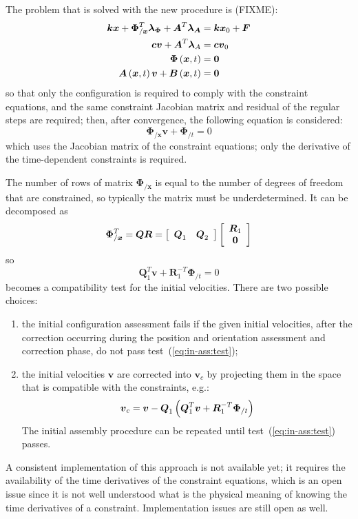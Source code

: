 \documentclass[10pt,dvips,fleqn]{report}
\newcommand{\T}[1]{\boldsymbol{#1}}
\begin{document}
The problem that is solved with the new procedure is (FIXME):
\begin{align}
	\T{k} \T{x} + \T{\Phi}_{/\T{x}}^T \T{\lambda}_{\T{\Phi}} + \T{A}^T \T{\lambda}_{\T{A}} 
		& = \T{k} \T{x}_0 + \T{F} \\
	\T{c} \T{v} + \T{A}^T \T{\lambda}_{A} & = \T{c} \T{v}_0 \\
	\T{\Phi}\plbr{\T{x}, t} & = \T{0} \\
	\T{A}\plbr{\T{x}, t} \T{v} + \T{B}\plbr{\T{x}, t} & = \T{0}
\end{align}
so that only the configuration is required to comply 
with the constraint equations, and the same constraint 
Jacobian matrix and residual of the regular steps are required;
then, after convergence, the following equation is considered:
\begin{equation}
	\T{\Phi}_{/\T{x}} \T{v} + \T{\Phi}_{/t} = 0
\end{equation}
which uses the Jacobian matrix of the constraint equations; 
only the derivative of the time-dependent constraints is required.

The number of rows of matrix $\T{\Phi}_{/\T{x}}$ is equal to the number 
of degrees of freedom that are constrained, so typically the matrix 
must be underdetermined.
It can be decomposed as
\begin{equation}
	\T{\Phi}_{/\T{x}}^T = \T{Q} \T{R}
		= \sqbr{\matr{cc}{\T{Q}_1 & \T{Q}_2}}\sqbr{\cvvect{\T{R}_1 \\ \T{0}}}
\end{equation}
so
\begin{equation}
	\T{Q}_1^T \T{v} + \T{R}_1^{-T} \T{\Phi}_{/t} = 0
	\label{eq:in-ass:test}
\end{equation}
becomes a compatibility test for the initial velocities.
There are two possible choices:
\begin{enumerate}
\item the initial configuration assessment fails if the given 
initial velocities, after the correction occurring during the position 
and orientation assessment and correction phase, do not pass 
test~(\ref{eq:in-ass:test});
\item the initial velocities $\T{v}$ are corrected into $\T{v}_c$ 
by projecting them in the space that is compatible with the constraints, 
e.g.:
\begin{equation}
	\T{v}_c = \T{v} - \T{Q}_1 \plbr{\T{Q}_1^T \T{v} + \T{R}_1^{-T}\T{\Phi}_{/t}}
\end{equation}
The initial assembly procedure can be repeated until 
test~(\ref{eq:in-ass:test}) passes.
\end{enumerate}
A consistent implementation of this approach is not available yet;
it requires the availability of the time derivatives 
of the constraint equations, which is an open issue since it is not
well understood what is the physical meaning of knowing 
the time derivatives of a constraint.
Implementation issues are still open as well.
\end{document}
